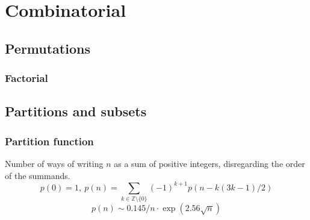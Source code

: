\chapter{Combinatorial}

\section{Permutations}
	\subsection{Factorial}
		





\section{Partitions and subsets}
	\subsection{Partition function}
		Number of ways of writing $n$ as a sum of positive integers, disregarding the order of the summands.
		\[ p(0) = 1,\ p(n) = \sum_{k \in \mathbb Z \setminus \{0\}}{(-1)^{k+1} p(n - k(3k-1) / 2)} \]
		\[ p(n) \sim 0.145 / n \cdot \exp(2.56 \sqrt{n}) \]

